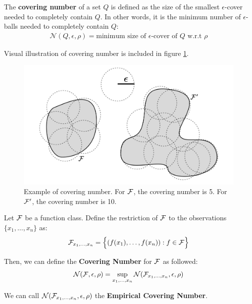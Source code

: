 \begin{definition}
    The \textbf{covering number} of a set $Q$ is defined as the size of the smallest $\epsilon$-cover needed to completely contain $Q$. In other words, it is the minimum number of $\epsilon$-balls needed to completely contain $Q$:
    \begin{align*}
        \mathcal{N}(Q, \epsilon, \rho) = \text{minimum size of $\epsilon$-cover of $Q$ w.r.t $\rho$}
    \end{align*}

    \noindent Visual illustration of covering number is included in figure \ref{fig:covering_number}.
\end{definition}

\begin{figure}[ht]
    \centering
    \includegraphics[width=\textwidth]{figures/covering_number.png}
    \caption{Example of covering number. For $\mathcal{F}$, the covering number is 5. For $\mathcal{F}'$, the covering number is 10.}
    \label{fig:covering_number}
\end{figure}


\begin{definition}
    Let $\mathcal{F}$ be a function class. Define the restriction of $\mathcal{F}$ to the observations $\{x_1, \dots, x_n\}$ as:
    \begin{align*}
        \mathcal{F}_{x_1, \dots, x_n} = \Big\{ 
            (f(x_1), \dots, f(x_n)) : f \in \mathcal{F}
         \Big\}
    \end{align*}

    \noindent Then, we can define the \textbf{Covering Number} for $\mathcal{F}$ as followed:
    \begin{align*}
        \mathcal{N}(\mathcal{F}, \epsilon, \rho) = \sup_{x_1, \dots, x_n} \mathcal{N}(\mathcal{F}_{x_1, \dots, x_n}, \epsilon, \rho)
    \end{align*}

    \noindent We can call $\mathcal{N}(\mathcal{F}_{x_1, \dots, x_n}, \epsilon, \rho)$ the \textbf{Empirical Covering Number}.
\end{definition}


